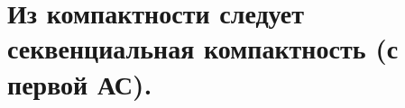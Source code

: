 \documentclass[geometry.tex]{subfiles}
\begin{document}
  \section{Из компактности следует секвенциальная компактность (с первой АС).}
\end{document}
